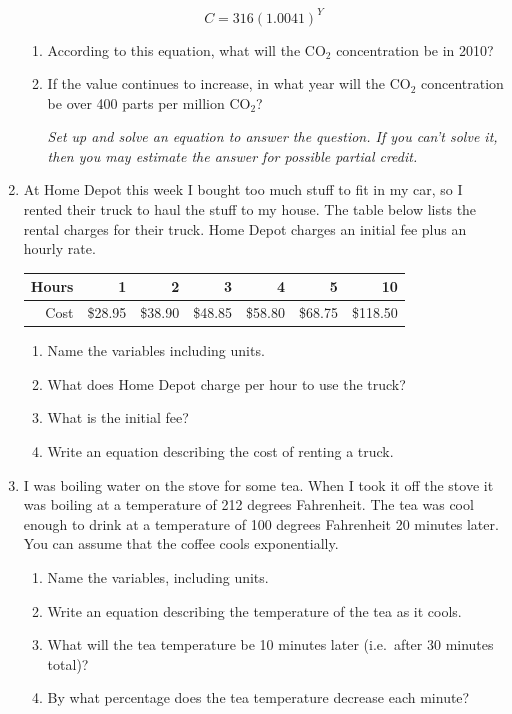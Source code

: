 \documentclass[12pt]{article}
\begin{document}
\begin{enumerate}
$$C=316(1.0041)^Y$$

\begin{enumerate}
\item According to this equation, what will the CO$_{2}$ concentration be in 2010?
\vfill
\item If the value continues to increase, in what year will the CO$_{2}$ concentration be over 400 parts per million CO$_{2}$?

\emph{Set up and solve an equation to answer the question.  If you can't solve it, then you may estimate the answer for possible partial credit.}
\vfill
\vfill
\vfill
\end{enumerate}


\newpage %

\item At Home Depot this week I bought too much stuff to fit in my car, so I rented their truck to haul the stuff to my house.  The table below lists the rental charges for their truck.  Home Depot charges an initial fee plus an hourly rate.

\begin{center}
\begin{tabular} {|r|r|r|r|r|r|r|} \hline
Hours & 1 & 2 & 3 & 4 & 5 & 10 \\ \hline
Cost & \$28.95 & \$38.90 & \$48.85 & \$58.80 & \$68.75 & \$118.50 \\ \hline
\end{tabular}
\end{center}

\begin{enumerate}
\item Name the variables including units.
\vfill
\item What does Home Depot charge per hour to use the truck?
\vfill
\item What is the initial fee?
\vfill
\item Write an equation describing the cost of renting a truck.
\vfill
\end{enumerate}

\newpage %

\item I was boiling water on the stove for some tea.  When I took it off the stove it was boiling at a temperature of 212 degrees Fahrenheit. The tea was cool enough to drink at a temperature of 100 degrees Fahrenheit 20 minutes later. You can assume that the coffee cools exponentially.

\begin{enumerate}
\item Name the variables, including units.
\vfill
\item Write an equation describing the temperature of the tea as it cools.
\vfill

\item What will the tea temperature be 10 minutes later (i.e.\ after 30 minutes total)?
\vfill
\item By what percentage does the tea temperature decrease each minute?
\vfill
\end{enumerate}



\end{enumerate}
\end{document}
